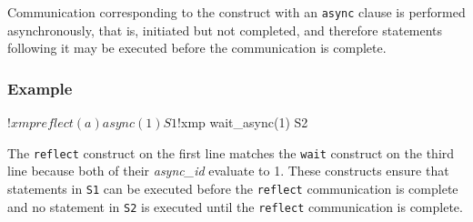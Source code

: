 Communication corresponding to the construct with an {\tt async} clause
is performed asynchronously, that is, initiated but not completed,
and therefore statements following it may be executed before the
communication is complete.

\subsubsection*{Example}

\begin{XFexample}
!$xmp reflect (a) async(1)
      S1
!$xmp wait_async(1)
      S2
\end{XFexample}

The {\tt reflect} construct on the first line matches
the {\tt wait} construct on the third line because both of their {\it
async\_id} evaluate to 1.
%
These constructs ensure that statements in {\tt S1} can be executed
before the {\tt reflect} communication is complete and no statement in
{\tt S2} is executed until the {\tt reflect} communication is
complete.
